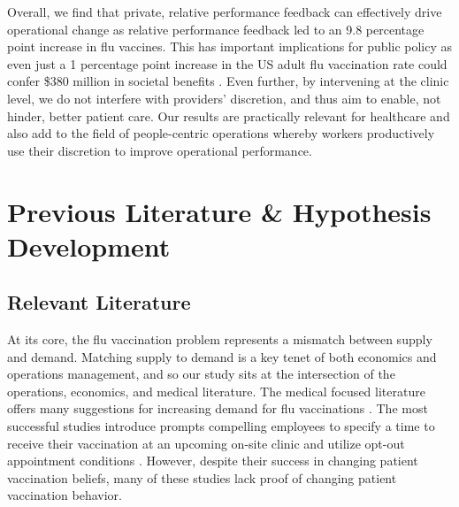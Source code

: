 \begin{onehalfspace}
 Overall, we find that private, relative performance feedback can effectively drive operational change as relative performance feedback led to an 9.8 percentage point increase in flu vaccines. This has important implications for public policy as even just a 1 percentage point increase in the US adult flu vaccination rate could confer \$380 million in societal benefits \citep{White2021}. Even further, by intervening at the clinic level, we do not interfere with providers’ discretion, and thus aim to enable, not hinder, better patient care. Our results are practically relevant for healthcare and also add to the field of people-centric operations whereby workers productively use their discretion to improve operational performance. 

 
\section{Previous Literature \& Hypothesis Development} \label{HD}
 \subsection{Relevant Literature}
 At its core, the flu vaccination problem represents a mismatch between supply and demand. Matching supply to demand is a key tenet of both economics and operations management, and so our study sits at the intersection of the operations, economics, and medical literature. The medical focused literature offers many suggestions for increasing demand for flu vaccinations \citep[see][]{Brewer2017}. The most successful studies introduce prompts compelling employees to specify a time to receive their vaccination at an upcoming on-site clinic \citep{Milkman2011} and utilize opt-out appointment conditions \citep{Chapman2010,Chapman2016}. However, despite their success in changing patient vaccination beliefs, many of these studies lack proof of changing patient vaccination behavior.
	

\end{onehalfspace}
